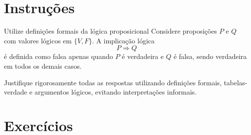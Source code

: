 \documentclass[12pt]{article}
\begin{document}
\vspace*{0.2cm}
\section*{Instruções}

\begin{block}{Utilize definições formais da lógica proposicional}
Considere proposições $P$ e $Q$ com valores lógicos em $\{V, F\}$.
A implicação lógica
\[
P \Rightarrow Q
\]
é definida como falsa apenas quando $P$ é verdadeira e $Q$ é falsa,
sendo verdadeira em todos os demais casos.
\end{block}

Justifique rigorosamente todas as respostas utilizando definições formais,
tabelas-verdade e argumentos lógicos, evitando interpretações informais.



\section*{Exercícios}
\end{document}
